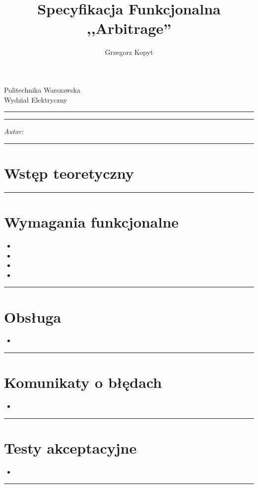 \documentclass[a4paper,11pt]{article}
\author{Grzegorz Kopyt}
\title{Specyfikacja Funkcjonalna \\
,,Arbitrage''}
\makeatletter
\newcommand{\linia}{\rule{\linewidth}{0.4mm}}
\renewcommand{\maketitle}{\begin{titlepage}
    \vspace*{2cm}
    \begin{center}\LARGE
    Politechnika Warszawska\\
    Wydział Elektryczny\\
    \end{center}
    \vspace{5cm}
    \noindent\linia
    \begin{center}
      \LARGE \textsc{\@title}
         \end{center}
     \linia
    \vspace{0.5cm}
    \begin{flushright}
    \begin{minipage}{5cm}
    \textit{Autor:}\\
    \normalsize \textsc{\@author} \par
    \end{minipage}
    \vspace{5cm}
     \end{flushright}
    \vspace*{\stretch{6}}
    \begin{center}
    \@date
    \end{center}
  \end{titlepage}%
}
\makeatother
\begin{document}
\maketitle

\tableofcontents
\vspace{1cm}
\noindent\linia
\section{Wstęp teoretyczny}


\noindent\linia
\section{Wymagania funkcjonalne}
\begin{itemize}
\item 
\item 
\item 
\item 
\end{itemize}

\noindent\linia
\section{Obsługa}

\begin{itemize}
\item 

\end{itemize}

\noindent\linia
\section{Komunikaty o błędach}
\begin{itemize}
\item 
\end{itemize}

\noindent\linia
\section{Testy akceptacyjne}

\begin{itemize}
\item 

\end{itemize}

\noindent\linia
\end{document}
